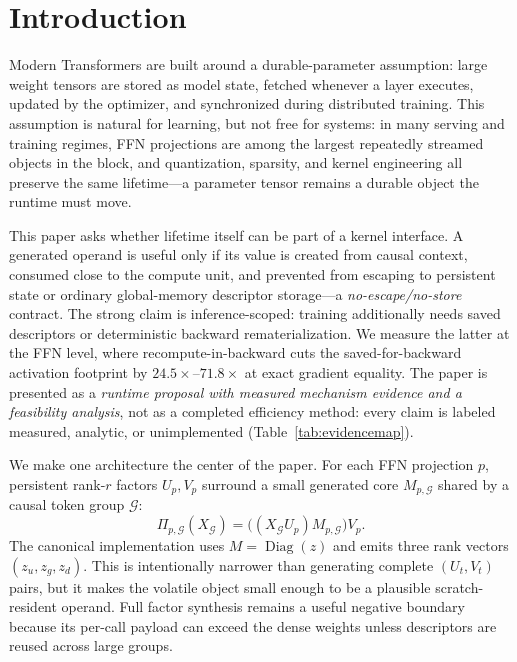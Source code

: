 \section{Introduction}

Modern Transformers \cite{vaswani2017attention,kaplan2020scaling,hoffmann2022chinchilla}
are built around a durable-parameter assumption: large weight tensors are
stored as model state, fetched whenever a layer executes, updated by the
optimizer, and synchronized during distributed training. This assumption is
natural for learning, but not free for systems: in many serving and training
regimes, FFN projections are among the largest repeatedly streamed objects in
the block, and quantization, sparsity, and kernel engineering all preserve the
same lifetime---a parameter tensor remains a durable object the runtime must
move.

This paper asks whether lifetime itself can be part of a kernel interface.  A
generated operand is useful only if its value is created from causal context,
consumed close to the compute unit, and prevented from escaping to persistent
state or ordinary global-memory descriptor storage---a
\emph{no-escape/no-store} contract. The strong claim is inference-scoped:
training additionally needs saved descriptors or deterministic backward
rematerialization. We measure the latter at the FFN level, where
recompute-in-backward cuts the saved-for-backward activation footprint by
$24.5\times$--$71.8\times$ at exact gradient equality. The paper is presented
as a \emph{runtime proposal with measured mechanism evidence and a feasibility
analysis}, not as a completed efficiency method: every claim is labeled
measured, analytic, or unimplemented (Table~\ref{tab:evidencemap}).

We make one architecture the center of the paper.  For each FFN projection
$p$, persistent rank-$r$ factors $U_p,V_p$ surround a small generated core
$M_{p,\mathcal G}$ shared by a causal token group $\mathcal G$:
\begin{equation}
\Pi_{p,\mathcal G}(X_{\mathcal G})=
\bigl((X_{\mathcal G}U_p)M_{p,\mathcal G}\bigr)V_p.
\label{eq:core-intro}
\end{equation}
The canonical implementation uses $M=\operatorname{Diag}(z)$ and emits three
rank vectors $(z_u,z_g,z_d)$.  This is intentionally narrower than generating
complete $(U_t,V_t)$ pairs, but it makes the volatile object small enough to be
a plausible scratch-resident operand.  Full factor synthesis remains a useful
negative boundary because its per-call payload can exceed the dense weights
unless descriptors are reused across large groups.

